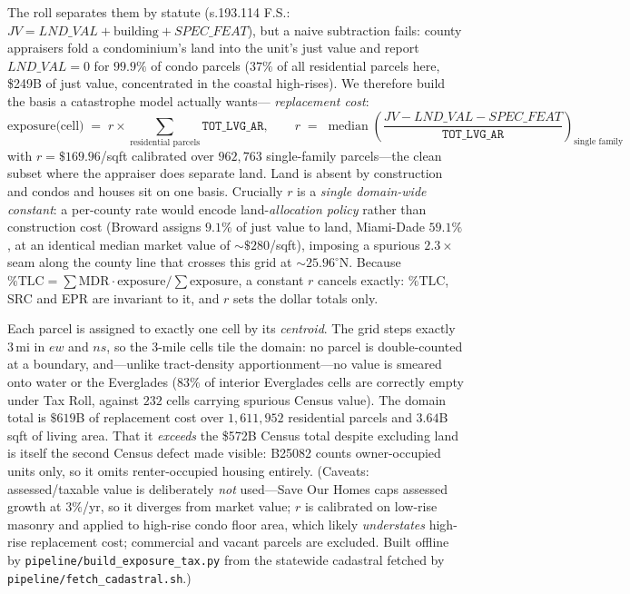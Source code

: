 \documentclass[11pt]{article}
\begin{document}
The roll separates them by statute (s.193.114 F.S.: $JV = LND\_VAL + \text{building} +
SPEC\_FEAT$), but a naive subtraction fails: county appraisers fold a condominium's land
into the unit's just value and report $LND\_VAL = 0$ for $99.9\%$ of condo parcels
($37\%$ of all residential parcels here, \$249B of just value, concentrated in the
coastal high-rises). We therefore build the basis a catastrophe model actually wants---
\emph{replacement cost}:
\[
\text{exposure(cell)} \;=\; r \times \!\!\sum_{\text{residential parcels}}\!\! \texttt{TOT\_LVG\_AR},
\qquad
r \;=\; \operatorname{median}\!\left(\frac{JV - LND\_VAL - SPEC\_FEAT}{\texttt{TOT\_LVG\_AR}}\right)_{\text{single family}}
\]
with $r=\$169.96$/sqft calibrated over $962{,}763$ single-family parcels---the clean
subset where the appraiser does separate land. Land is absent by construction and condos
and houses sit on one basis. Crucially $r$ is a \emph{single domain-wide constant}: a
per-county rate would encode land-\emph{allocation policy} rather than construction cost
(Broward assigns $9.1\%$ of just value to land, Miami-Dade $59.1\%$, at an identical
median market value of ${\sim}\$280$/sqft), imposing a spurious $2.3\times$ seam along
the county line that crosses this grid at ${\sim}25.96^\circ$N. Because
$\%\text{TLC}=\sum \text{MDR}\cdot\text{exposure}/\sum\text{exposure}$, a constant $r$
cancels exactly: $\%\text{TLC}$, SRC and EPR are invariant to it, and $r$ sets the dollar
totals only.

Each parcel is assigned to exactly one cell by its \emph{centroid}. The grid steps
exactly $3$\,mi in $ew$ and $ns$, so the 3-mile cells tile the domain: no parcel is
double-counted at a boundary, and---unlike tract-density apportionment---no value is
smeared onto water or the Everglades ($83\%$ of interior Everglades cells are correctly
empty under Tax Roll, against $232$ cells carrying spurious Census value). The domain
total is $\$619$B of replacement cost over $1{,}611{,}952$ residential parcels and
$3.64$B sqft of living area. That it \emph{exceeds} the \$572B Census total despite
excluding land is itself the second Census defect made visible: B25082 counts
owner-occupied units only, so it omits renter-occupied housing entirely.
(Caveats: assessed/taxable value is deliberately \emph{not} used---Save Our Homes caps
assessed growth at $3\%$/yr, so it diverges from market value; $r$ is calibrated on
low-rise masonry and applied to high-rise condo floor area, which likely
\emph{understates} high-rise replacement cost; commercial and vacant parcels are
excluded. Built offline by \texttt{pipeline/build\_exposure\_tax.py} from the statewide
cadastral fetched by \texttt{pipeline/fetch\_cadastral.sh}.)
\end{document}
